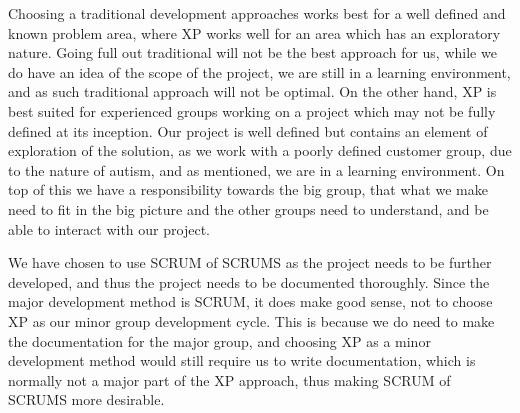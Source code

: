 Choosing a traditional development approaches works best for a well defined and known problem area, where XP works well for an area which has an exploratory nature. Going full out traditional will not be the best approach for us, while we do have an idea of the scope of the project, we are still in a learning environment, and as such traditional approach will not be optimal. On the other hand, XP is best suited for experienced groups working on a project which may not be fully defined at its inception. Our project is well defined but contains an element of exploration of the solution, as we work with a poorly defined customer group, due to the nature of autism, and as mentioned, we are in a learning environment. On top of this we have a responsibility towards the big group, that what we make need to fit in the big picture and the other groups need to understand, and be able to interact with our project. 

We have chosen to use SCRUM of SCRUMS as the project needs to be further developed, and thus the project needs to be documented thoroughly. Since the major development method is SCRUM, it does make good sense, not to choose XP as our minor group development cycle. This is because we do need to make the documentation for the major group, and choosing XP as a minor development method would still require us to write documentation, which is normally not a major part of the XP approach, thus making SCRUM of SCRUMS more desirable.